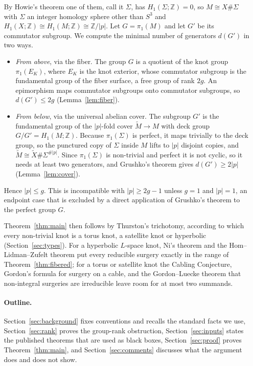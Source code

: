 \documentclass[11pt]{article}
\newcommand{\Z}{\mathbb Z}
\newcommand{\rk}{d}
\theoremstyle{definition}
\theoremstyle{remark}
\begin{document}
By Howie's theorem one of them, call it \(\Sigma\), has
\(H_1(\Sigma;\Z)=0\), so \(M\cong X\#\Sigma\) with \(\Sigma\) an integer
homology sphere other than \(S^3\) and \(H_1(X;\Z)\cong H_1(M;\Z)\cong\Z/|p|\).
Let \(G=\pi_1(M)\) and let \(G'\) be its commutator subgroup. We compute
the minimal number of generators \(\rk(G')\) in two ways.
\begin{itemize}
\item \emph{From above}, via the fiber. The group \(G\) is a quotient of
the knot group \(\pi_1(E_K)\), where \(E_K\) is the knot exterior, whose
commutator subgroup is the
fundamental group of the fiber surface, a free group of rank \(2g\). An
epimorphism maps commutator subgroups onto commutator subgroups, so
\(\rk(G')\leq 2g\) (Lemma~\ref{lem:fiber}).
\item \emph{From below}, via the universal abelian cover. The subgroup
\(G'\) is the fundamental group of the \(|p|\)-fold cover
\(\widetilde M\to M\) with deck group \(G/G'=H_1(M;\Z)\). Because
\(\pi_1(\Sigma)\) is perfect, it maps trivially to the deck group, so the
punctured copy of \(\Sigma\) inside \(M\) lifts to \(|p|\) disjoint copies,
and \(\widetilde M\cong\widetilde X\#\Sigma^{\#|p|}\). Since
\(\pi_1(\Sigma)\) is non-trivial and perfect it is not cyclic, so it needs
at least two generators, and Grushko's theorem gives
\(\rk(G')\geq 2|p|\) (Lemma~\ref{lem:cover}).
\end{itemize}
Hence \(|p|\leq g\). This is incompatible with \(|p|\geq 2g-1\) unless
\(g=1\) and \(|p|=1\), an endpoint case that is excluded by a direct
application of Grushko's theorem to the perfect group \(G\).


Theorem~\ref{thm:main} then follows by Thurston's trichotomy, according
to which every non-trivial knot is a torus knot, a satellite knot or
hyperbolic (Section~\ref{sec:types}). For a hyperbolic \(L\)-space knot, Ni's theorem and the Hom--Lidman--Zufelt
theorem put every reducible surgery exactly in the range of
Theorem~\ref{thm:fibered}; for a torus or satellite knot the Cabling
Conjecture, Gordon's formula for surgery on a cable, and the
Gordon--Luecke theorem that non-integral surgeries are irreducible leave
room for at most two summands.

\paragraph{Outline.}
Section~\ref{sec:background} fixes
conventions and recalls the standard facts we use,
Section~\ref{sec:rank} proves the group-rank obstruction,
Section~\ref{sec:inputs} states the published theorems that are used as
black boxes, Section~\ref{sec:proof} proves Theorem~\ref{thm:main}, and
Section~\ref{sec:comments} discusses what the argument does and does not
show.
\end{document}
